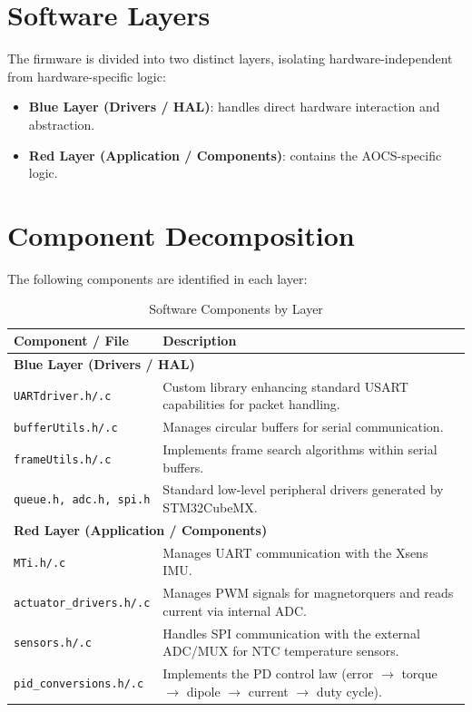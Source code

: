 \section{Software Layers}

The firmware is divided into two distinct layers, isolating hardware-independent from hardware-specific logic:  

\begin{itemize}
    \item \textbf{Blue Layer (Drivers / HAL)}: handles direct hardware interaction and abstraction.
    \item \textbf{Red Layer (Application / Components)}: contains the AOCS-specific logic.
\end{itemize}

\section{Component Decomposition}

The following components are identified in each layer:

\begin{table}[H]
\centering
\begin{tabular}{|l|>{\raggedright\arraybackslash}p{10cm}|}
\hline
\textbf{Component / File} & \textbf{Description} \\ \hline
\multicolumn{2}{|l|}{\textbf{Blue Layer (Drivers / HAL)}} \\ \hline
\texttt{UARTdriver.h/.c} & Custom library enhancing standard USART capabilities for packet handling. \\ \hline
\texttt{bufferUtils.h/.c} & Manages circular buffers for serial communication. \\ \hline
\texttt{frameUtils.h/.c} & Implements frame search algorithms within serial buffers. \\ \hline
\texttt{queue.h, adc.h, spi.h} & Standard low-level peripheral drivers generated by STM32CubeMX. \\ \hline
\multicolumn{2}{|l|}{\textbf{Red Layer (Application / Components)}} \\ \hline
\texttt{MTi.h/.c} & Manages UART communication with the Xsens IMU. \\ \hline
\texttt{actuator\_drivers.h/.c} & Manages PWM signals for magnetorquers and reads current via internal ADC. \\ \hline
\texttt{sensors.h/.c} & Handles SPI communication with the external ADC/MUX for NTC temperature sensors. \\ \hline
\texttt{pid\_conversions.h/.c} & Implements the PD control law (error $\to$ torque $\to$ dipole $\to$ current $\to$ duty cycle). \\ \hline
\end{tabular}
\caption{Software Components by Layer}
\label{tab:software_layers}
\end{table}
